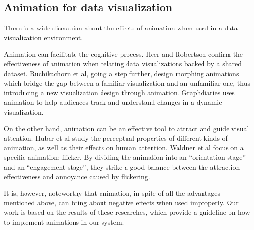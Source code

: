 \subsection{Animation for data visualization}
There is a wide discussion about the effects of animation when used in a data visualization environment.\par 
Animation can facilitate the cognitive process. Heer and Robertson \cite{heer_animated_2007-1} confirm the effectiveness of animation when relating data visualizations backed by a shared dataset. Ruchikachorn et al\cite{ruchikachorn_learning_2015}, going a step further, design morphing animations which bridge the gap between a familiar visualization and an unfamiliar one, thus introducing a new visualization design through animation. Graphdiaries \cite{bach_graphdiaries:_2014} uses animation to help audiences track and understand changes in a dynamic visualization. \par
On the other hand, animation can be an effective tool to attract and guide visual attention. Huber et al \cite{huber_visualizing_2005} study the perceptual properties of different kinds of animation, as well as their effects on human attention. Waldner et al \cite{waldner_attractive_2014} focus on a specific animation: flicker. By dividing the animation into an “orientation stage” and an “engagement stage”, they strike a good balance between the attraction effectiveness and annoyance caused by flickering. \par
It is, however, noteworthy that animation, in spite of all the advantages mentioned above, can bring about negative effects when used improperly\cite{robertson_effectiveness_2008}. Our work is based on the results of these researches, which provide a guideline on how to implement animations in our system.\par
